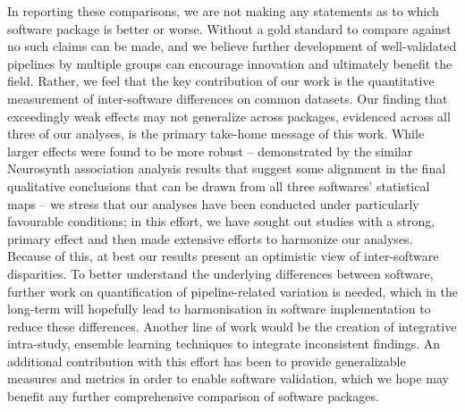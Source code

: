 In reporting these comparisons, we are not making any statements as to which software package is better or worse. Without a gold standard to compare against no such claims can be made, and we believe further development of well-validated pipelines by multiple groups can encourage innovation and ultimately benefit the field. Rather, we feel that the key contribution of our work is the quantitative measurement of inter-software differences on common datasets. Our finding that exceedingly weak effects may not generalize across packages, evidenced across all three of our analyses, is the primary take-home message of this work. While larger effects were found to be more robust -- demonstrated by the similar Neurosynth association analysis results that suggest some alignment in the final qualitative conclusions that can be drawn from all three softwares' statistical maps -- we stress that our analyses have been conducted under particularly favourable conditions; in this effort, we have sought out studies with a strong, primary effect and then made extensive efforts to harmonize our analyses. Because of this, at best our results present an optimistic view of inter-software disparities. To better understand the underlying differences between software, further work on quantification of pipeline-related variation is needed, which in the long-term will hopefully lead to harmonisation in software implementation to reduce these differences. Another line of work would be the creation of integrative intra-study, ensemble learning techniques to integrate inconsistent findings. An additional contribution with this effort has been to provide generalizable measures and metrics in order to enable software validation, which we hope may benefit any further comprehensive comparison of software packages.
